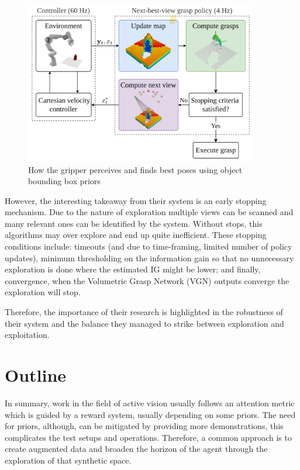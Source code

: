 \begin{figure}[h]
  \centering
  \includegraphics[width=0.9\textwidth]{assets/rel-work/target-grasp.png}
  \caption{How the gripper perceives and finds best poses using object bounding box priors \cite{breyer2022closedloopnextbestviewplanningtargetdriven}}\label{fig:closedloop}
\end{figure}

However, the interesting takeaway from their system is an early stopping mechanism. Due to the nature of exploration multiple views can be scanned and many relevant ones can be identified by the system. Without stops, this algorithms may over explore and end up quite inefficient. These stopping conditions include: timeouts (and due to time-framing, limited number of policy updates), minimum thresholding on the information gain so that no unnecessary exploration is done where the estimated IG might be lower; and finally, convergence, when the Volumetric Grasp Network (VGN) \cite{breyer2021volumetricgraspingnetworkrealtime} outputs converge the exploration will stop. 

Therefore, the importance of their research is highlighted in the robustness of their system and the balance they managed to strike between exploration and exploitation. 


\section{Outline}
In summary, work in the field of active vision usually follows an attention metric which is guided by a reward system, usually depending on some priors. The need for priors, although, can be mitigated by providing more demonstrations, this complicates the test setups and operations. Therefore, a common approach is to create augmented data and broaden the horizon of the agent through the exploration of that synthetic space.


